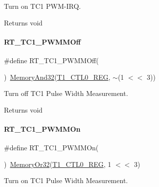 Turn on T\+C1 P\+W\+M-\/\+I\+RQ. 

\begin{DoxyReturn}{Returns}
void 
\end{DoxyReturn}
\mbox{\label{a00044_aa070a043272a38ae84492146683a00d3}} 
\paragraph{\texorpdfstring{R\+T\+\_\+\+T\+C1\+\_\+\+P\+W\+M\+M\+Off}{RT\_TC1\_PWMMOff}}
{\footnotesize\ttfamily \#define R\+T\+\_\+\+T\+C1\+\_\+\+P\+W\+M\+M\+Off(\begin{DoxyParamCaption}{ }\end{DoxyParamCaption})~\mbox{\hyperlink{a00020_ad87cedffcaadc51db22594fce55173d4}{Memory\+And32}}(\mbox{\hyperlink{a00020_a55600694c3c73a1019f78d306f474fa1}{T1\+\_\+\+C\+T\+L0\+\_\+\+R\+EG}}, $\sim$(1 $<$$<$ 3))}



Turn off T\+C1 Pulse Width Measurement. 

\begin{DoxyReturn}{Returns}
void 
\end{DoxyReturn}
\mbox{\label{a00044_a6f11e47b5a8e7947fc76e9955e94acea}} 
\paragraph{\texorpdfstring{R\+T\+\_\+\+T\+C1\+\_\+\+P\+W\+M\+M\+On}{RT\_TC1\_PWMMOn}}
{\footnotesize\ttfamily \#define R\+T\+\_\+\+T\+C1\+\_\+\+P\+W\+M\+M\+On(\begin{DoxyParamCaption}{ }\end{DoxyParamCaption})~\mbox{\hyperlink{a00020_a27874a97deab7cecdde5ddecf466e31e}{Memory\+Or32}}(\mbox{\hyperlink{a00020_a55600694c3c73a1019f78d306f474fa1}{T1\+\_\+\+C\+T\+L0\+\_\+\+R\+EG}}, 1 $<$$<$ 3)}



Turn on T\+C1 Pulse Width Measurement. 

